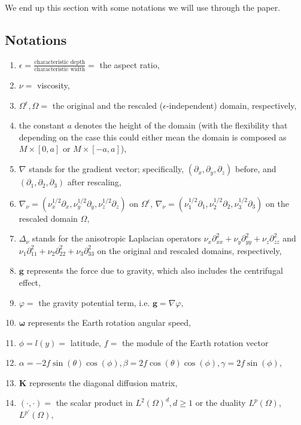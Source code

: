 \documentclass[11pt, a4paper]{article}
\begin{document}
We end up this section with some notations we will use through the paper.

\subsection{Notations}

\begin{enumerate}

\item $\epsilon = \frac{\text{characteristic depth}}{\text{characteristic width}} = $ the aspect ratio,
\item $\nu = $ viscosity,
\item $\Omega^\epsilon, \Omega = $ the original and the rescaled ($\epsilon$-independent) domain, respectively,
\item the constant $a$ denotes the height of the domain (with the flexibility that depending on the case this could either mean the domain is composed as $M \times [0,a]$ or $M \times [-a, a]$),
\item $\nabla$ stands for the gradient vector; specifically, $(\partial_x, \partial_y, \partial_z)$ before, and $(\partial_1, \partial_2, \partial_3)$ after rescaling,
\item $\nabla_\nu = (\nu_x^{1/2} \partial_x, \nu_y^{1/2} \partial_y, \nu_z^{1/2} \partial_z)$ on $\Omega^\epsilon$, $\nabla_\nu = (\nu_1^{1/2} \partial_1, \nu_2^{1/2} \partial_2, \nu_3^{1/2} \partial_3)$ on the rescaled domain $\Omega,$
\item $ \Delta_\nu$ stands for the anisotropic Laplacian operators $\nu_x \partial^2_{xx} + \nu_y \partial^2_{yy} + \nu_z \partial^2_{zz}$ and $\nu_1 \partial^2_{11} + \nu_2 \partial^2_{22} + \nu_3 \partial^2_{33}$ on the original and rescaled domains, respectively,
\item $\mathbf{g}$ represents the force due to gravity, which also includes the centrifugal effect,
\item $\varphi = $ the gravity potential term, i.e. $\mathbf{g} = \nabla \varphi,$
\item $\mathbf{\omega}$ represents the Earth rotation angular speed,
\item $\phi = l(y) = $ latitude, $f = $ the module of the Earth rotation vector
\item $\alpha = -2 f \sin(\theta)\cos(\phi), \beta = 2 f \cos(\theta) \cos(\phi), \gamma = 2 f \sin(\phi),$
\item $\mathbf{K}$ represents the diagonal diffusion matrix,
\item $( \cdot,\cdot) = $ the scalar product in $L^2(\Omega)^d, d \geq 1$ or the duality $L^p (\Omega)$, $L^{p'} (\Omega),$

\end{enumerate}
\end{document}
